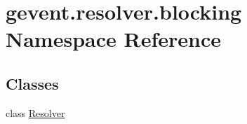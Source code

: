 \hypertarget{namespacegevent_1_1resolver_1_1blocking}{}\section{gevent.\+resolver.\+blocking Namespace Reference}
\label{namespacegevent_1_1resolver_1_1blocking}
\subsection*{Classes}
\begin{DoxyCompactItemize}
\item 
class \hyperlink{classgevent_1_1resolver_1_1blocking_1_1_resolver}{Resolver}
\end{DoxyCompactItemize}
